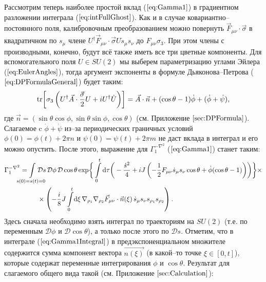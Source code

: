 
Рассмотрим теперь наиболее простой вклад ($\ref{eq:Gamma1}$) в градиентном разложении интеграла ($\ref{eq:intFullGhost}$). Как и в случае ковариантно--постоянного поля, калибровочным преобразованием можно повернуть $\vec{F}_{\mu \nu}\cdot\vec{\sigma}$ в квадратичном по $s_\mu$ члене $U^\dagger \vec{F}_{\mu \nu}\cdot\vec{\sigma}U\dot{s}_\mu s_\nu$ до $F_{\mu \nu}\sigma_3$. При этом члены с производными, конечно, будут всё также иметь все три цветные компоненты. Для вспомогательного поля $U\in SU(2)$ мы выберем параметризацию углами Эйлера ($\ref{eq:EulerAngles}$), тогда аргумент экспоненты в формуле Дьяконова--Петрова ($\ref{eq:DPFormulaGeneral}$) будет таким:
\begin{equation*}
	\mathrm{tr}\!\left[\sigma_3\left(U^\dagger \vec{A}\cdot\frac{\vec{\sigma}}{2} U + iU^\dagger \dot{U}\right)\right] = \vec{A}\cdot\vec{n} + (\cos{\theta} - 1)\dot{\phi} + (\dot{\phi} + \dot{\psi}),
\end{equation*}
где $\vec{n}=(\sin{\theta}\cos{\phi}, \sin{\theta}\sin{\phi}, \cos{\theta})$ (см. Приложение $\ref{sec:DPFormula}$). Слагаемое c $\dot{\phi}+\dot{\psi}$ из--за периодических граничных условий $\phi(0)=\phi(t)+2\pi n$ и $\psi(0)=\psi(t)+2\pi m$ не даст вклада в интеграл и его можно опустить. После этого, выражение для $\Gamma^{-\nabla^2}_1$ ($\ref{eq:Gamma1}$) станет таким:
\begin{equation}
	\label{eq:Gamma1Integral}
	\begin{split}
\Gamma^{-\nabla^2}_1=\mkern-6\thickmuskip\int\limits_{s(0)=s(t)=0}\mkern-5\thickmuskip&\mathcal{D}s\,\mathcal{D}\phi\,\mathcal{D}\cos{\theta} \exp\biggr\{ \int\limits_0^t \D \tau \biggr(-\frac{\dot{s}^2}{4} + iJ\left( -\frac12 F_{\mu\nu}\dot{s}_\mu s_\nu \cos{\theta} + \dot{\phi} (\cos{\theta} - 1)\right) \biggr)\biggr\}\times\\
&\times \left( -\frac{i}{8}J \int\limits_0^t \!\D \xi\,\nabla_{\rho_1}\nabla_{\rho_2}\vec{F}_{\mu \nu}\cdot \vec{n}(\xi)\, \dot{s}_\mu s_\nu s_{\rho_1} s_{\rho_2} \right).
	\end{split}
\end{equation}
Здесь сначала необходимо взять интеграл по траекториям на $SU(2)$ (т.е. по переменным $\mathcal{D}\phi$ и $\mathcal{D}\cos{\theta}$), а только после этого по $\mathcal{D}s$. Отметим, что в интеграле ($\ref{eq:Gamma1Integral}$) в предэкспоненциальном множителе содержится сумма компонент вектора $\vec{n(\xi)}$ (в какой--то точке $\xi\in [0,t]$), которые содержат переменные интегрирования $\phi$ и $\cos{\theta}$. Результат для слагаемого общего вида такой (см. Приложение $\ref{sec:Calculation}$):
